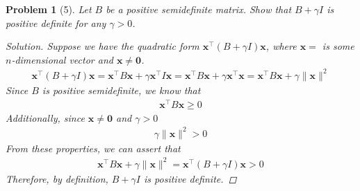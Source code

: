 \documentclass[11pt]{article}
\theoremstyle{quest}
\newtheorem*{problem}{Problem}
\newenvironment{solution}
  {\begin{mdframed}\begin{proof}[Solution]}
  {\end{proof}\end{mdframed}}
\begin{document}
\begin{problem}[5]
    Let $B$ be a positive semidefinite matrix. Show that $B + \gamma I$ is positive definite for any $\gamma > 0$.
    \begin{solution}
    Suppose we have the quadratic form $\mathbf{x}^\intercal (B + \gamma I) \mathbf{x}$, where $\mathbf{x} = $ is some $n$-dimensional vector and $\mathbf{x} \ne \mathbf{0}$.
    \begin{align*}
       \mathbf{x}^\intercal (B + \gamma I) \mathbf{x} = \mathbf{x}^\intercal B \mathbf{x} + \gamma \mathbf{x}^\intercal I \mathbf{x} =  \mathbf{x}^\intercal B \mathbf{x} + \gamma \mathbf{x}^\intercal \mathbf{x} = \mathbf{x}^\intercal B \mathbf{x} + \gamma \|\mathbf{x}\|^2
    \end{align*}
    Since $B$ is positive semidefinite, we know that
    \begin{align*}
        \mathbf{x}^\intercal B \mathbf{x} \ge 0
    \end{align*}
    Additionally, since $\mathbf{x} \ne \mathbf{0}$ and $\gamma > 0$
    \begin{align*}
        \gamma \|\mathbf{x}\|^2 > 0
    \end{align*}
    From these properties, we can assert that
    \begin{align*}
        \mathbf{x}^\intercal B \mathbf{x} + \gamma \|\mathbf{x}\|^2 = \mathbf{x}^\intercal (B + \gamma I) \mathbf{x} > 0
    \end{align*}
    Therefore, by definition, $B + \gamma I$ is positive definite.
    \end{solution}
\end{problem}
\end{document}
